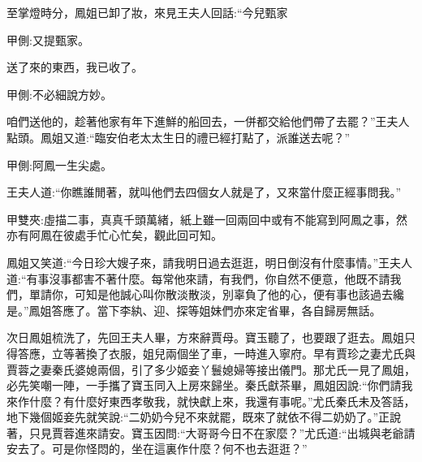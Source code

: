 \begin{parag}
    至掌燈時分，鳳姐已卸了妝，來見王夫人回話:“今兒甄家\begin{note}甲側:又提甄家。\end{note}送了來的東西，我已收了。\begin{note}甲側:不必細說方妙。\end{note}咱們送他的，趁著他家有年下進鮮的船回去，一併都交給他們帶了去罷？”王夫人點頭。鳳姐又道:“臨安伯老太太生日的禮已經打點了，派誰送去呢？”\begin{note}甲側:阿鳳一生尖處。\end{note}王夫人道:“你瞧誰閒著，就叫他們去四個女人就是了，又來當什麼正經事問我。”\begin{note}甲雙夾:虛描二事，真真千頭萬緒，紙上雖一回兩回中或有不能寫到阿鳳之事，然亦有阿鳳在彼處手忙心忙矣，觀此回可知。\end{note}鳳姐又笑道:“今日珍大嫂子來，請我明日過去逛逛，明日倒沒有什麼事情。”王夫人道:“有事沒事都害不著什麼。每常他來請，有我們，你自然不便意，他既不請我們，單請你，可知是他誠心叫你散淡散淡，別辜負了他的心，便有事也該過去纔是。”鳳姐答應了。當下李紈、迎、探等姐妹們亦來定省畢，各自歸房無話。
\end{parag}


\begin{parag}
    次日鳳姐梳洗了，先回王夫人畢，方來辭賈母。寶玉聽了，也要跟了逛去。鳳姐只得答應，立等著換了衣服，姐兒兩個坐了車，一時進入寧府。早有賈珍之妻尤氏與賈蓉之妻秦氏婆媳兩個，引了多少姬妾丫鬟媳婦等接出儀門。那尤氏一見了鳳姐，必先笑嘲一陣，一手攜了寶玉同入上房來歸坐。秦氏獻茶畢，鳳姐因說:“你們請我來作什麼？有什麼好東西孝敬我，就快獻上來，我還有事呢。”尤氏秦氏未及答話，地下幾個姬妾先就笑說:“二奶奶今兒不來就罷，既來了就依不得二奶奶了。”正說著，只見賈蓉進來請安。寶玉因問:“大哥哥今日不在家麼？”尤氏道:“出城與老爺請安去了。可是你怪悶的，坐在這裏作什麼？何不也去逛逛？”
\end{parag}


